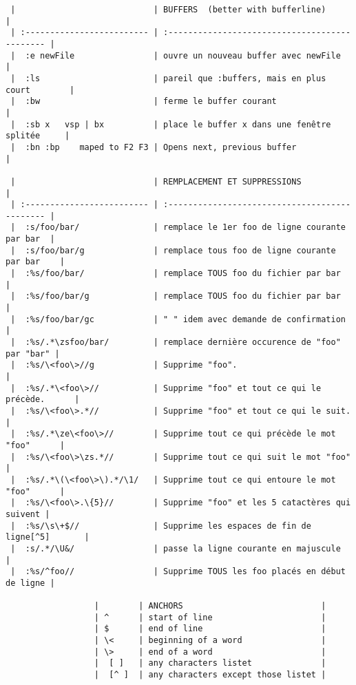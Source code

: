 \documentclass[10pt,landscape]{article}
\begin{document}
\begin{multicols}{2}
\begin{verbatim}
 |                            | BUFFERS  (better with bufferline)              |
 | :------------------------- | :--------------------------------------------- |
 |  :e newFile                | ouvre un nouveau buffer avec newFile           |
 |  :ls                       | pareil que :buffers, mais en plus court        |
 |  :bw                       | ferme le buffer courant                        |
 |  :sb x   vsp | bx          | place le buffer x dans une fenêtre splitée     |
 |  :bn :bp    maped to F2 F3 | Opens next, previous buffer                    |

 |                            | REMPLACEMENT ET SUPPRESSIONS                   |
 | :------------------------- | :--------------------------------------------- |
 |  :s/foo/bar/               | remplace le 1er foo de ligne courante par bar  |
 |  :s/foo/bar/g              | remplace tous foo de ligne courante par bar    |
 |  :%s/foo/bar/              | remplace TOUS foo du fichier par bar           |
 |  :%s/foo/bar/g             | remplace TOUS foo du fichier par bar           |
 |  :%s/foo/bar/gc            | " " idem avec demande de confirmation          |
 |  :%s/.*\zsfoo/bar/         | remplace dernière occurence de "foo" par "bar" |
 |  :%s/\<foo\>//g            | Supprime "foo".                                |
 |  :%s/.*\<foo\>//           | Supprime "foo" et tout ce qui le précède.      |
 |  :%s/\<foo\>.*//           | Supprime "foo" et tout ce qui le suit.         |
 |  :%s/.*\ze\<foo\>//        | Supprime tout ce qui précède le mot "foo"      |
 |  :%s/\<foo\>\zs.*//        | Supprime tout ce qui suit le mot "foo"         |
 |  :%s/.*\(\<foo\>\).*/\1/   | Supprime tout ce qui entoure le mot "foo"      |
 |  :%s/\<foo\>.\{5}//        | Supprime "foo" et les 5 catactères qui suivent |
 |  :%s/\s\+$//               | Supprime les espaces de fin de ligne[^5]       |
 |  :s/.*/\U&/                | passe la ligne courante en majuscule           |
 |  :%s/^foo//                | Supprime TOUS les foo placés en début de ligne |

                  |        | ANCHORS                            |
                  | ^      | start of line                      |
                  | $      | end of line                        |
                  | \<     | beginning of a word                |
                  | \>     | end of a word                      |
                  |  [ ]   | any characters listet              |
                  |  [^ ]  | any characters except those listet |


\end{verbatim}
\end{multicols}
\end{document}
